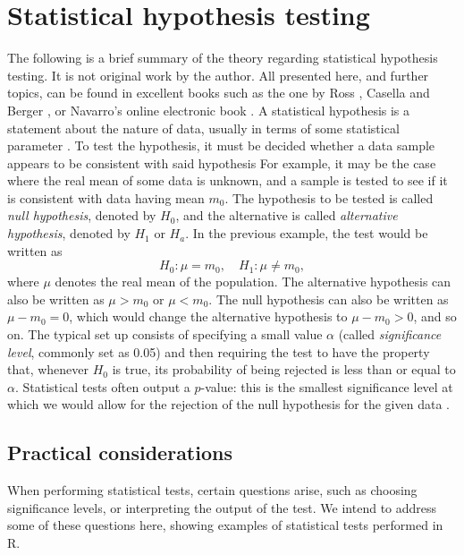\documentclass[letterpaper, 10 pt, conference]{article}
\begin{document}
\section{Statistical hypothesis testing}
The following is a brief summary of the theory regarding statistical hypothesis testing. It is not original work by the author. All presented here, and further topics, can be found in excellent books such as the one by Ross \cite{Ross_2010}, Casella and Berger \cite{Casella_Berger_2002}, or Navarro's online electronic book \cite{Navarro}.
 A statistical hypothesis is a statement about the nature of data, usually in terms of some statistical parameter \cite{Ross_2010}. To test the hypothesis, it must be decided whether a data sample appears to be consistent with said hypothesis For example, it may be the case where the real mean of some data is unknown, and a sample is tested to see if it is consistent with data having mean $m_0$. The hypothesis to be tested is called {\it null hypothesis}, denoted by $H_0$, and the alternative is called \textit{alternative hypothesis}, denoted by $H_1$ or $H_a$. In the previous example, the test would be written as
\begin{equation}
	H_0 : \mu = m_0, \quad H_1 : \mu \neq m_0,
\end{equation}
where $\mu$ denotes the real mean of the population. The alternative hypothesis can also be written as $\mu > m_0$ or $\mu < m_0$. The null hypothesis can also be written as $\mu - m_0 = 0$, which would change the alternative hypothesis to $\mu - m_0 > 0$, and so on. 
The typical set up consists of specifying a small value $\alpha$ (called \textit{significance level}, commonly set as 0.05) and then requiring the test to have the property that, whenever $H_0$ is true, its probability of being rejected is less than or equal to $\alpha$. Statistical tests often output a $p$-value: this is the smallest significance level at which we would allow for the rejection of the null hypothesis for the given data \cite{Navarro, Ross_2010}. 

\subsection{Practical considerations }
When performing statistical tests, certain questions arise, such as choosing significance levels, or interpreting the output of the test. We intend to address some of these questions here, showing examples of statistical tests performed in R.  
\end{document}
